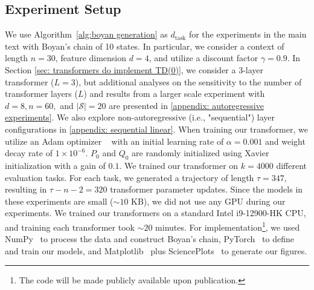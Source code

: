 \documentclass{article}
\begin{document}
\subsection{Experiment Setup} \label{appendix: experiment setup}
We use Algorithm~\ref{alg:boyan generation} as $d_\text{task}$ for the experiments in the main text with Boyan's chain of 10 states.
In particular,
we consider a context of length $n=30$, feature dimension $d=4$, and utilize a discount factor $\gamma = 0.9$. In Section \ref{sec: transformers do implement TD(0)}, we consider a 3-layer transformer ($L=3$), but additional analyses on the sensitivity to the number of transformer layers ($L$) and results from a larger scale experiment with $d=8, n=60,$ and $|\mathcal{S}|=20$ are presented in \ref{appendix: autoregressive experiments}. We also explore non-autoregressive (i.e., "sequential") layer configurations in \ref{appendix: sequential linear}.
When training our transformer, we utilize an Adam optimizer ~\citep{kingma2014adam} with an initial learning rate of $\alpha = 0.001$ and weight decay rate of $1\times 10^{-6}$. $P_0$ and $Q_0$ are randomly initialized using Xavier initialization with a gain of $0.1$.
We trained our transformer on $k=4000$ different evaluation tasks.
For each task, we generated a trajectory of length $\tau = 347$, resulting in $\tau - n -2 = 320$ transformer parameter updates.
Since the models in these experiments are small ($\sim 10$ KB), we did not use any GPU during our experiments. We trained our transformers on a standard Intel i9-12900-HK CPU, and training each transformer took $\sim20$ minutes.
For implementation\footnote{The code will be made publicly available upon publication.}, we used NumPy~\citep{harris2020numpy} to process the data and construct Boyan's chain, PyTorch~\citep{ansel2024pytorch} to define and train our models, and Matplotlib~\citep{hunter2007matplotlib} plus SciencePlots~\citep{garrett2021SciencePlots} to generate our figures.
\end{document}
